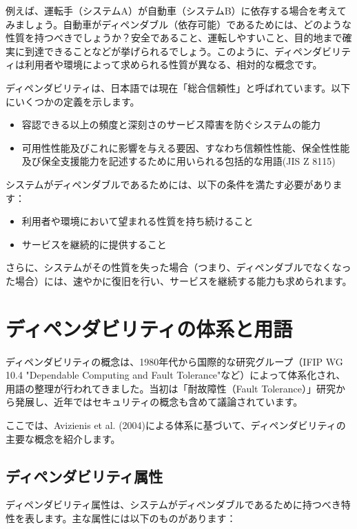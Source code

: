 例えば、運転手（システムA）が自動車（システムB）に依存する場合を考えてみましょう。自動車がディペンダブル（依存可能）であるためには、どのような性質を持つべきでしょうか？安全であること、運転しやすいこと、目的地まで確実に到達できることなどが挙げられるでしょう。このように、ディペンダビリティは利用者や環境によって求められる性質が異なる、相対的な概念です。

ディペンダビリティは、日本語では現在「総合信頼性」と呼ばれています。以下にいくつかの定義を示します。

\begin{itemize}
\item 容認できる以上の頻度と深刻さのサービス障害を防ぐシステムの能力
\item 可用性性能及びこれに影響を与える要因、すなわち信頼性性能、保全性性能及び保全支援能力を記述するために用いられる包括的な用語(JIS Z 8115)
\end{itemize}

システムがディペンダブルであるためには、以下の条件を満たす必要があります：

\begin{itemize}
\item 利用者や環境において望まれる性質を持ち続けること
\item サービスを継続的に提供すること
\end{itemize}

さらに、システムがその性質を失った場合（つまり、ディペンダブルでなくなった場合）には、速やかに復旧を行い、サービスを継続する能力も求められます。

\section{ディペンダビリティの体系と用語}

ディペンダビリティの概念は、1980年代から国際的な研究グループ（IFIP WG 10.4 "Dependable Computing and Fault Tolerance"など）によって体系化され、用語の整理が行われてきました。当初は「耐故障性（Fault Tolerance）」研究から発展し、近年ではセキュリティの概念も含めて議論されています。

ここでは、Avizienis et al. (2004)による体系に基づいて、ディペンダビリティの主要な概念を紹介します。

\subsection{ディペンダビリティ属性}

ディペンダビリティ属性は、システムがディペンダブルであるために持つべき特性を表します。主な属性には以下のものがあります：


